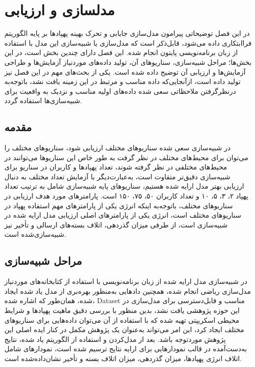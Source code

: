 \chapter{مدلسازی و ارزیابی}\label{Chapter4}
در این فصل توضیحاتی پیرامون مدل‌سازی جایابی و تحرک بهینه پهپادها بر پایه الگوریتم فراابتکاری  داده می‌شود، قابل‌ذکر است که مدل‌سازی یا شبیه‌سازی این مدل با استفاده از زبان برنامه‌نویسی پایتون انجام شده. این فصل دارای چندین بخش است، در این بخش‌ها؛ مراحل شبیه‌سازی، سناریوهای آن، تولید داده‌های موردنیاز آزمایش‌ها و طراحی آزمایش‌ها و ارزیابی آن توضیح داده شده است. یکی از بحث‌های مهم در این فصل نیز تولید داده است، ازآنجایی‌که داده مناسب و مرتبط در این زمینه یافت نشد، باتوجه‌به درنظرگرفتن ملاحظاتی سعی شده داده‌های اولیه مناسب و نزدیک به واقعیت برای شبیه‌سازی‌ها استفاده گردد.
\section{مقدمه}
در شبیه‌سازی سعی شده سناریوهای مختلف ارزیابی شود، سناریوهای مختلف را می‌توان برای محیط‌های مختلف در نظر گرفت به طور خاص این سناریوها می‌توانند در محیط‌های مختلفی در نظر گرفته شوند، تعداد پهپادها و کاربران در سناریو برای شبیه‌سازی دقیق‌تر متفاوت است، به‌عبارت‌دیگر با آزمایش تعداد مختلف به دنبال ارزیابی بهتر مدل ارایه شده هستیم، سناریوهای پایه شبیه‌سازی شامل به ترتیب تعداد پهپاد ۲، ۳، ۵، ۱۰ و تعداد کاربران ۵۰، ۷۵، ۱۵۰ است. پارامترهای مورد هدف ارزیابی در سناریوهای مختلف، باتوجه‌به اینکه انرژی یکی از پارامترهای مهم استفاده پهپاد در سناریوهای مختلف است، انرژی یکی از پارامترهای اصلی ارزیابی مدل ارایه شده در شبیه‌سازی است، از طرفی میزان گذردهی، اتلاف بسته‌های ارسالی و تأخیر نیز شبیه‌سازی‌شده است.
\section{مراحل شبیه‌سازی}
در شبیه‌سازی مدل ارایه شده از زبان برنامه‌نویسی  با استفاده از کتابخانه‌های موردنیاز مدل‌سازی ریاضی انجام شده، همچنین دادهایی به‌منظور بهره‌بری از مدل یاد شده ایجاد شده، همان‌طور که اشاره شده، \gls{Dataset} مناسب و قابل‌دسترسی برای مدل‌سازی در این حوزه پژوهشی یافت نشد، بدین منظور با بررسی دقیق ماهیت پهپادها و شرایط محیطی اسکریپتی تهیه شده که با استفاده از آن می‌توان داده‌هایی برای سناریوهای مختلف ایجاد کرد، این امر می‌تواند به‌عنوان یک پژوهش مکمل در کنار ایده اصلی این پژوهش موردتوجه باشد. بعد از مدل‌کردن و استفاده از الگوریتم یاد شده، نتایج به‌دست‌آمده در قالب نمودارهایی برای ارایه نتایج ترسیم شده است، نمودارهای شامل اتلاف انرژی پهپادها، میزان گذردهی، میزان اتلاف بسته و تأخیر نشان‌داده‌شده است.

